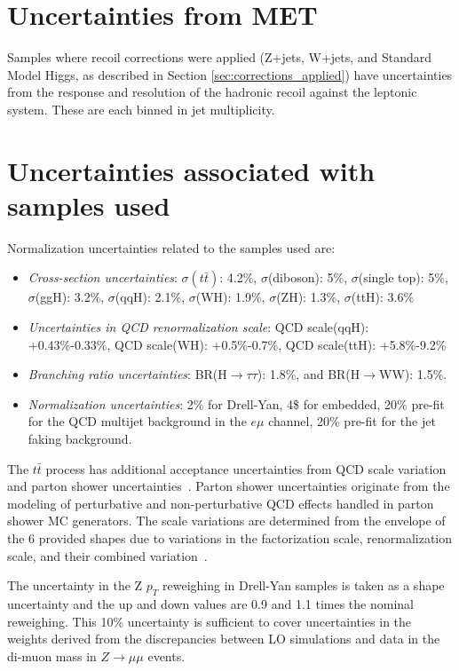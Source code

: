 \section{Uncertainties from MET}
\label{section:MET_uncertainties}
Samples where recoil corrections were applied (Z+jets, W+jets, and Standard Model Higgs, as described in Section \ref{sec:corrections_applied}) have uncertainties from the response and resolution of the hadronic recoil against the leptonic system. These are each binned in jet multiplicity.

\section{Uncertainties associated with samples used}
\label{section:uncertainties_samples}
Normalization uncertainties related to the samples used are:
\begin{itemize}
    \item \textit{Cross-section uncertainties}: $\sigma(t\bar{t})$: 4.2\%, $\sigma$(diboson): 5\%,  $\sigma$(single top): 5\%, $\sigma$(ggH): 3.2\%, $\sigma$(qqH): 2.1\%, $\sigma$(WH): 1.9\%, $\sigma$(ZH): 1.3\%, $\sigma$(ttH): 3.6\%
    \item \textit{Uncertainties in QCD renormalization scale}: QCD scale(qqH): +0.43\%-0.33\%, QCD scale(WH): +0.5\%-0.7\%, QCD scale(ttH): +5.8\%-9.2\%
    \item \textit{Branching ratio uncertainties}: BR(H$\rightarrow\tau\tau$): 1.8\%, and BR(H$\rightarrow$WW): 1.5\%.
    \item \textit{Normalization uncertainties}: 2\% for Drell-Yan, 4\$ for embedded, 20\% pre-fit for the QCD multijet background in the $e\mu$ channel, 20\% pre-fit for the jet faking background.
\end{itemize}

The $t\bar{t}$ process has additional acceptance uncertainties from QCD scale variation and parton shower uncertainties~\cite{twiki_Top_systematics}.  Parton shower uncertainties originate from the modeling of perturbative and non-perturbative QCD effects handled in parton shower MC generators. The scale variations are determined from the envelope of the 6 provided shapes due to variations in the factorization scale, renormalization scale, and their combined variation~\cite{twiki_Top_systematics}.

The uncertainty in the Z $p_{T}$ reweighing in Drell-Yan samples is taken as a shape uncertainty and the up and down values are 0.9 and 1.1 times the nominal reweighing. This 10\% uncertainty is sufficient to cover uncertainties in the weights derived from the discrepancies between LO simulations and data in the di-muon mass in $Z \rightarrow \mu\mu$ events.

